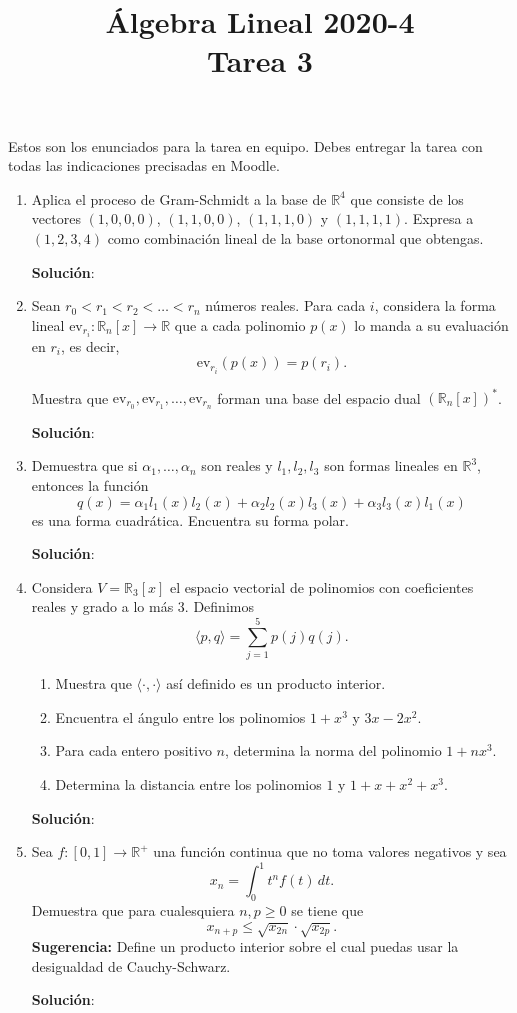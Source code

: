 \documentclass{article}
\title{Álgebra Lineal 2020-4\\ Tarea 3}
\date{ }
\begin{document}
\maketitle
Estos son los enunciados para la tarea en equipo. Debes entregar la tarea con todas las indicaciones precisadas en Moodle.

\begin{enumerate}
    \item Aplica el proceso de Gram-Schmidt a la base de $\mathbb{R}^4$ que consiste de los vectores $(1,0,0,0)$, $(1,1,0,0)$, $(1,1,1,0)$ y $(1,1,1,1)$. Expresa a $(1,2,3,4)$ como combinación lineal de la base ortonormal que obtengas.
    
    \textbf{Solución}:
    
    
    \item Sean $r_0<r_1<r_2<\ldots<r_n$ números reales. Para cada $i$, considera la forma lineal $\text{ev}_{r_i}:\mathbb{R}_n[x]\to \mathbb{R}$ que a cada polinomio $p(x)$ lo manda a su evaluación en $r_i$, es decir, $$\text{ev}_{r_i}(p(x))=p(r_i).$$
    
    Muestra que $\text{ev}_{r_0},\text{ev}_{r_1},\ldots, \text{ev}_{r_n}$ forman una base del espacio dual  $(\mathbb{R}_n[x])^{\ast}$.
    
    \textbf{Solución}:
    
    
    \item Demuestra que si $\alpha_1,\ldots,\alpha_n$ son reales y $l_1,l_2,l_3$ son formas lineales en $\mathbb{R}^3$, entonces la función $$q(x)=\alpha_1l_1(x)l_2(x)+\alpha_2l_2(x)l_3(x)+\alpha_3 l_3(x)l_1(x)$$ es una forma cuadrática. Encuentra su forma polar.
    
    \textbf{Solución}:
    
    
    \item Considera $V=\mathbb{R}_3[x]$ el espacio vectorial de polinomios con coeficientes reales y grado a lo más $3$. Definimos $$\langle p,q \rangle = \sum_{j=1}^5 p(j)q(j).$$
    
    \begin{enumerate}
        \item Muestra que $\langle \cdot, \cdot \rangle$ así definido es un producto interior.
        \item Encuentra el ángulo entre los polinomios $1+x^3$ y $3x-2x^2$.
        \item Para cada entero positivo $n$, determina la norma del polinomio $1+nx^3$.
        \item Determina la distancia entre los polinomios $1$ y $1+x+x^2+x^3$.
    \end{enumerate}
    
    \textbf{Solución}:
    
    
    \item Sea $f:[0,1]\to \mathbb{R}^+$ una función continua que no toma valores negativos y sea $$x_n=\int_0 ^1 t^n f(t)\, dt.$$
    Demuestra que para cualesquiera $n,p\geq 0$ se tiene que 
    $$x_{n+p}\leq \sqrt{x_{2n}}\cdot \sqrt{x_{2p}}.$$ \textbf{Sugerencia:} Define un producto interior sobre el cual puedas usar la desigualdad de Cauchy-Schwarz.
    
    \textbf{Solución}:
    
    
\end{enumerate}
\end{document}

